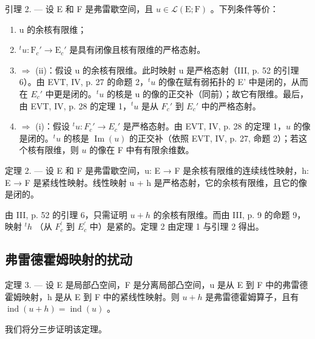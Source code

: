 引理 2. --- 设 E 和 F 是弗雷歇空间，且 \(u \in \mathcal{L}(\mathrm{E};\mathrm{F})\) 。下列条件等价：

\begin{enumerate}
\def\labelenumi{(\roman{enumi})}
\item
  u 的余核有限维；
\item
  \(^{t}u \colon \mathrm{F}_c' \to \mathrm{E}_c'\) 是具有闭像且核有限维的严格态射。
\item
  \(\Longrightarrow\) (ii)：假设 u 的余核有限维。此时映射 u 是严格态射（III, p. 52 的引理 6）。由 EVT, IV, p. 27 的命题 2，\(^{t}u\) 的像在赋有弱拓扑的 E' 中是闭的，从而在 \(E_{c}'\) 中更是闭的。\(^{t}u\) 的核是 u 的像的正交补（同前）；故它有限维。最后，由 EVT, IV, p. 28 的定理 1，\(^{t}u\) 是从 \(F_{c}'\) 到 \(E_{c}'\) 中的严格态射。
\item
  \(\Longrightarrow\) (i)：假设 \(^t u\colon F_c' \to E_c'\) 是严格态射。由 EVT, IV, p. 28 的定理 1，\(u\) 的像是闭的。\(^t u\) 的核是 \(\operatorname{Im}(u)\) 的正交补（依照 EVT, IV, p. 27, 命题 2）；若这个核有限维，则 \(u\) 的像在 F 中有有限余维数。
\end{enumerate}

定理 2. --- 设 E 和 F 是弗雷歇空间，u: E → F 是余核有限维的连续线性映射，h: E → F 是紧线性映射。线性映射 u + h 是严格态射，它的余核有限维，且它的像是闭的。

由 III, p. 52 的引理 6，只需证明 \(u + h\) 的余核有限维。而由 III, p. 9 的命题 9，映射 \(^{t}h\) （从 \(F_{c}^{\prime}\) 到 \(E_{c}^{\prime}\) 中）是紧的。定理 2 由定理 1 与引理 2 得出。

\subsection{弗雷德霍姆映射的扰动}

定理 3. --- 设 E 是局部凸空间，F 是分离局部凸空间，u 是从 E 到 F 中的弗雷德霍姆映射，h 是从 E 到 F 中的紧线性映射。则 \(u + h\) 是弗雷德霍姆算子，且有 \(\operatorname{ind}(u + h) = \operatorname{ind}(u)\) 。

我们将分三步证明该定理。

